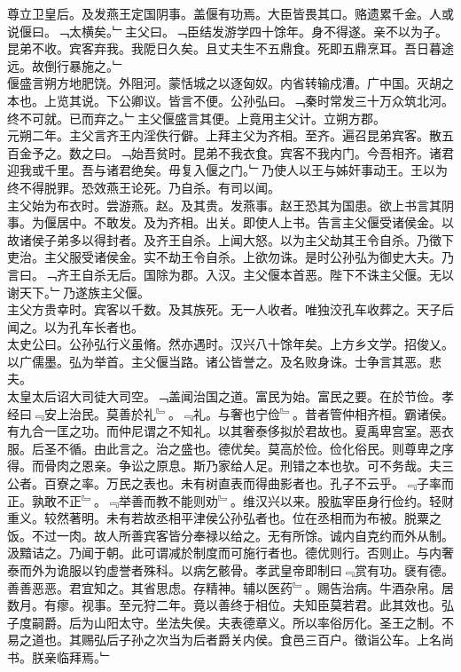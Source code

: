 \documentclass{zhvt-classic}
\begin{document}
\hspace*{2em}尊立卫皇后。及发燕王定国阴事。盖偃有功焉。大臣皆畏其口。赂遗累千金。人或说偃曰。﹁太横矣。﹂主父曰。﹁臣结发游学四十馀年。身不得遂。亲不以为子。昆弟不收。宾客弃我。我阸日久矣。且丈夫生不五鼎食。死即五鼎烹耳。吾日暮途远。故倒行暴施之。﹂\\
\hspace*{2em}偃盛言朔方地肥饶。外阻河。蒙恬城之以逐匈奴。内省转输戍漕。广中国。灭胡之本也。上览其说。下公卿议。皆言不便。公孙弘曰。﹁秦时常发三十万众筑北河。终不可就。已而弃之。﹂主父偃盛言其便。上竟用主父计。立朔方郡。\\
\hspace*{2em}元朔二年。主父言齐王内淫佚行僻。上拜主父为齐相。至齐。遍召昆弟宾客。散五百金予之。数之曰。﹁始吾贫时。昆弟不我衣食。宾客不我内门。今吾相齐。诸君迎我或千里。吾与诸君绝矣。毋复入偃之门。﹂乃使人以王与姊奸事动王。王以为终不得脱罪。恐效燕王论死。乃自杀。有司以闻。\\
\hspace*{2em}主父始为布衣时。尝游燕。赵。及其贵。发燕事。赵王恐其为国患。欲上书言其阴事。为偃居中。不敢发。及为齐相。出关。即使人上书。告言主父偃受诸侯金。以故诸侯子弟多以得封者。及齐王自杀。上闻大怒。以为主父劫其王令自杀。乃徵下吏治。主父服受诸侯金。实不劫王令自杀。上欲勿诛。是时公孙弘为御史大夫。乃言曰。﹁齐王自杀无后。国除为郡。入汉。主父偃本首恶。陛下不诛主父偃。无以谢天下。﹂乃遂族主父偃。\\
\hspace*{2em}主父方贵幸时。宾客以千数。及其族死。无一人收者。唯独洨孔车收葬之。天子后闻之。以为孔车长者也。\\
\hspace*{2em}太史公曰。公孙弘行义虽脩。然亦遇时。汉兴八十馀年矣。上方乡文学。招俊乂。以广儒墨。弘为举首。主父偃当路。诸公皆誉之。及名败身诛。士争言其恶。悲夫。\\
\hspace*{2em}太皇太后诏大司徒大司空。﹁盖闻治国之道。富民为始。富民之要。在於节俭。孝经曰﹃安上治民。莫善於礼﹄。﹃礼。与奢也宁俭﹄。昔者管仲相齐桓。霸诸侯。有九合一匡之功。而仲尼谓之不知礼。以其奢泰侈拟於君故也。夏禹卑宫室。恶衣服。后圣不循。由此言之。治之盛也。德优矣。莫高於俭。俭化俗民。则尊卑之序得。而骨肉之恩亲。争讼之原息。斯乃家给人足。刑错之本也欤。可不务哉。夫三公者。百寮之率。万民之表也。未有树直表而得曲影者也。孔子不云乎。﹃子率而正。孰敢不正﹄。﹃举善而教不能则劝﹄。维汉兴以来。股肱宰臣身行俭约。轻财重义。较然著明。未有若故丞相平津侯公孙弘者也。位在丞相而为布被。脱粟之饭。不过一肉。故人所善宾客皆分奉禄以给之。无有所馀。诚内自克约而外从制。汲黯诘之。乃闻于朝。此可谓减於制度而可施行者也。德优则行。否则止。与内奢泰而外为诡服以钓虚誉者殊科。以病乞骸骨。孝武皇帝即制曰﹃赏有功。襃有德。善善恶恶。君宜知之。其省思虑。存精神。辅以医药﹄。赐告治病。牛酒杂帛。居数月。有瘳。视事。至元狩二年。竟以善终于相位。夫知臣莫若君。此其效也。弘子度嗣爵。后为山阳太守。坐法失侯。夫表德章义。所以率俗厉化。圣王之制。不易之道也。其赐弘后子孙之次当为后者爵关内侯。食邑三百户。徵诣公车。上名尚书。朕亲临拜焉。﹂\\
\end{document}
